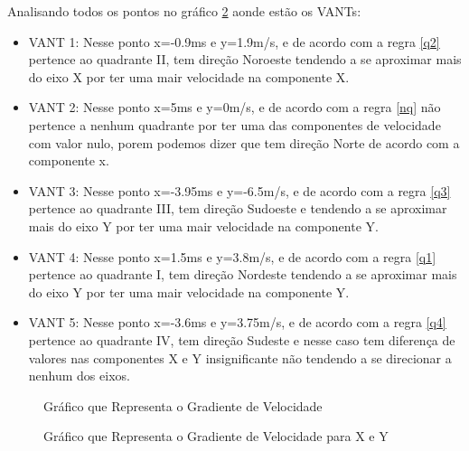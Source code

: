 Analisando todos os pontos no gráfico \ref{fig:teste9} aonde estão os VANTs:

\begin{itemize}
	\item VANT 1: Nesse ponto x=-0.9ms e y=1.9m/s, e de acordo com a regra \ref{q2} pertence ao quadrante II, tem direção Noroeste tendendo a se aproximar mais do eixo X por ter uma mair velocidade na componente X.
	\item VANT 2: Nesse ponto x=5ms e y=0m/s, e de acordo com a regra \ref{nq} não pertence a nenhum quadrante por ter uma das componentes de velocidade com valor nulo, porem podemos dizer que tem direção Norte de acordo com a componente x.
	\item VANT 3: Nesse ponto x=-3.95ms e y=-6.5m/s, e de acordo com a regra \ref{q3} pertence ao quadrante III, tem direção Sudoeste e tendendo a se aproximar mais do eixo Y por ter uma mair velocidade na componente Y.
	\item VANT 4: Nesse ponto x=1.5ms e y=3.8m/s, e de acordo com a regra \ref{q1} pertence ao quadrante I, tem direção Nordeste tendendo a se aproximar mais do eixo Y por ter uma mair velocidade na componente Y.
	\item VANT 5: Nesse ponto x=-3.6ms e y=3.75m/s, e de acordo com a regra \ref{q4} pertence ao quadrante IV, tem direção Sudeste e nesse caso tem diferença de valores nas componentes X e Y insignificante não tendendo a se direcionar a nenhum dos eixos.
\end{itemize}
 

\begin{figure}[htpb]
	\centering
	\caption{Gráfico que Representa o Gradiente de Velocidade}
	
	\label{fig:teste8}
\end{figure}

\begin{figure}[H]
	\centering
	\caption{Gráfico que Representa o Gradiente de Velocidade para X e Y}
	
	\label{fig:teste9}
\end{figure}

%	

